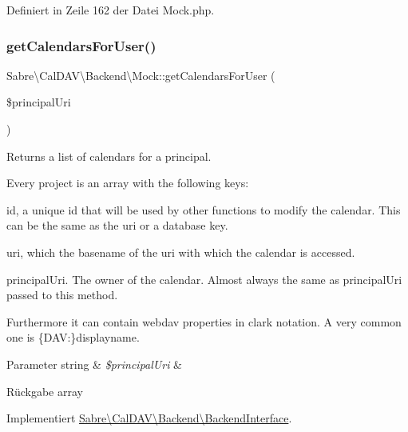 Definiert in Zeile 162 der Datei Mock.\+php.

\mbox{\label{class_sabre_1_1_cal_d_a_v_1_1_backend_1_1_mock_a97477c67412f556a2dbaf70c8632642e}} 
\subsubsection{\texorpdfstring{get\+Calendars\+For\+User()}{getCalendarsForUser()}}
{\footnotesize\ttfamily Sabre\textbackslash{}\+Cal\+D\+A\+V\textbackslash{}\+Backend\textbackslash{}\+Mock\+::get\+Calendars\+For\+User (\begin{DoxyParamCaption}\item[{}]{\$principal\+Uri }\end{DoxyParamCaption})}

Returns a list of calendars for a principal.

Every project is an array with the following keys\+:
\begin{DoxyItemize}
\item id, a unique id that will be used by other functions to modify the calendar. This can be the same as the uri or a database key.
\item uri, which the basename of the uri with which the calendar is accessed.
\item principal\+Uri. The owner of the calendar. Almost always the same as principal\+Uri passed to this method.
\end{DoxyItemize}

Furthermore it can contain webdav properties in clark notation. A very common one is \textquotesingle{}\{D\+AV\+:\}displayname\textquotesingle{}.


\begin{DoxyParams}[1]{Parameter}
string & {\em \$principal\+Uri} & \\
\hline
\end{DoxyParams}
\begin{DoxyReturn}{Rückgabe}
array 
\end{DoxyReturn}


Implementiert \mbox{\hyperlink{interface_sabre_1_1_cal_d_a_v_1_1_backend_1_1_backend_interface_a41d069c48af0155b8e6e04bee46c70ba}{Sabre\textbackslash{}\+Cal\+D\+A\+V\textbackslash{}\+Backend\textbackslash{}\+Backend\+Interface}}.



